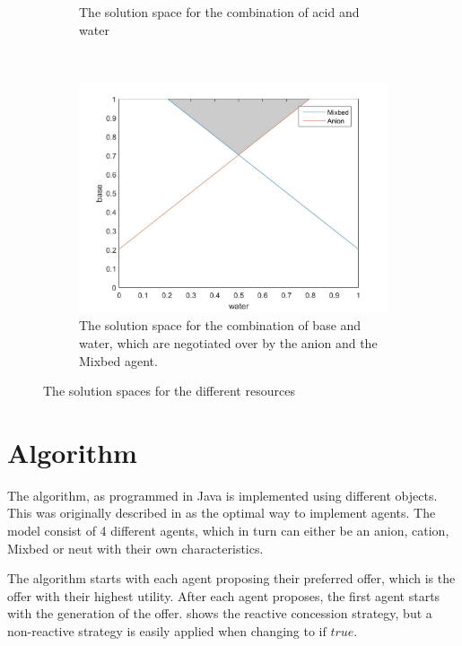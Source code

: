 \begin{figure}[h]
\begin{subfigure}[b]{0.4\textwidth}
		\caption{The solution space for the combination of acid and water}
		\label{fig:solutionwateracid}
	\end{subfigure}
	~
	\begin{subfigure}[b]{0.4\textwidth}
		\centering
		\includegraphics[width=\linewidth]{img/reservationcurve_water_base}
		\caption{The solution space for the combination of base and water, which are negotiated over by the anion and the Mixbed agent.}
		\label{fig:solutionwaterbase}
	\end{subfigure}
	\caption{The solution spaces for the different resources}\label{fig:solutionspace} 
\end{figure}

\clearpage
\section{Algorithm}
The algorithm, as programmed in Java is implemented using different objects. This was originally described in  as the optimal way to implement agents. The model consist of 4 different agents, which in turn can either be an anion, cation, Mixbed or neut with their own characteristics.

The algorithm starts with each agent proposing their preferred offer, which is the offer with their highest utility. After each agent proposes, the first agent starts with the generation of the offer.  shows the reactive concession strategy, but a non-reactive strategy is easily applied when changing  to $\text{if } true$.

